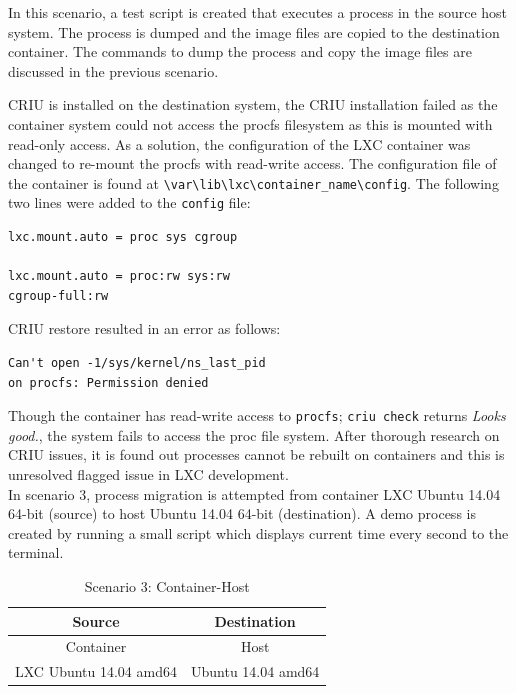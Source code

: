 \documentclass[conference]{IEEEtran}
\begin{document}
In this scenario, a test script is created that executes a process in the source host system. The process is dumped and the image files are copied to the destination container. The commands to dump the process and copy the image files are discussed in the previous scenario. 

CRIU is installed on the destination system, the CRIU installation failed as the container system could not access the procfs filesystem as this is mounted with read-only access. As a solution, the configuration of the LXC container was changed to re-mount the procfs with read-write access. The configuration file of the container is found at \verb|\var\lib\lxc\container_name\config|. The following two lines were added to the \verb|config| file:

\begin{verbatim}
lxc.mount.auto = proc sys cgroup

lxc.mount.auto = proc:rw sys:rw 
cgroup-full:rw
\end{verbatim}

\noindent CRIU restore resulted in an error as follows: 

\begin{verbatim}
Can't open -1/sys/kernel/ns_last_pid
on procfs: Permission denied
\end{verbatim} 

\noindent Though the container has read-write access to \verb|procfs|; \verb|criu check| returns \emph{Looks good.}, the system fails to access the proc file system. After thorough research on CRIU issues, it is found out processes cannot be rebuilt on containers and this is unresolved flagged issue in LXC development. \\

In scenario 3, process migration is attempted from container LXC Ubuntu 14.04 64-bit (source) to host Ubuntu 14.04 64-bit (destination). A demo process is created by running a small script which displays current time every second to the terminal. 

\begin{table}[htbp]
\caption{Scenario 3: Container-Host}
\begin{center}
\begin{tabular}{|c|c|}
\hline
\textbf{Source}&\textbf{Destination} \\
\cline{1-2} 
\hline
Container & Host  \\
LXC Ubuntu 14.04 amd64 & Ubuntu 14.04 amd64 \\
\hline
\end{tabular}
\label{table 4}
\end{center}
\end{table}
\end{document}
